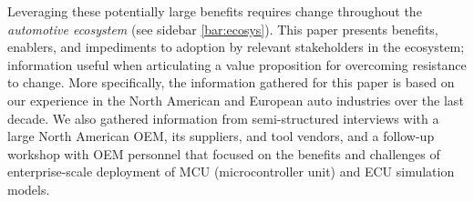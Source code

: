 Leveraging these potentially large benefits requires change throughout the \emph{automotive ecosystem} (see sidebar \ref{bar:ecosys}). 
This paper presents benefits, enablers, and impediments to adoption by relevant stakeholders in the ecosystem; information useful when articulating a value proposition for overcoming  resistance to change.
More specifically, the information gathered for this paper is based on our experience in the North American and European auto industries over the last decade.
We also gathered information from
semi-structured interviews with a large North American OEM, its suppliers, and tool vendors,
and a follow-up workshop with OEM personnel
that focused on the benefits and challenges of 
enterprise-scale deployment of MCU (microcontroller unit) and ECU
simulation models.

